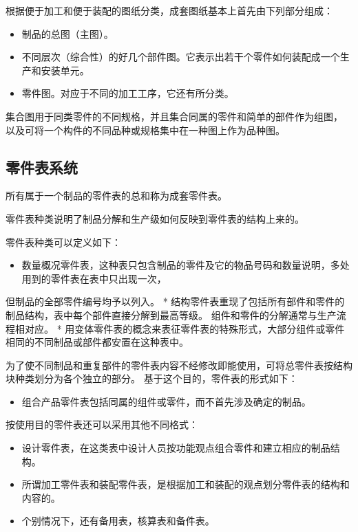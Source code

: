 \documentclass[letterpaper,10pt,english]{sphinxmanual}
\begin{document}
根据便于加工和便于装配的图纸分类，成套图纸基本上首先由下列部分组成：
\begin{itemize}
\item {} 
制品的总图（主图）。

\item {} 
不同层次（综合性）的好几个部件图。它表示出若干个零件如何装配成一个生产和安装单元。

\item {} 
零件图。对应于不同的加工工序，它还有所分类。

\end{itemize}

集合图用于同类零件的不同规格，并且集合同属的零件和简单的部件作为组图，
以及可将一个构件的不同品种或规格集中在一种图上作为品种图。


\subsection{零件表系统}
\label{unit8:id6}
所有属于一个制品的零件表的总和称为成套零件表。

零件表种类说明了制品分解和生产级如何反映到零件表的结构上来的。

零件表种类可以定义如下：
\begin{itemize}
\item {} 
数量概况零件表，这种表只包含制品的零件及它的物品号码和数量说明，多处用到的零件表在表中只出现一次，

\end{itemize}

但制品的全部零件编号均予以列入。
* 结构零件表重现了包括所有部件和零件的制品结构，表中每个部件直接分解到最高等级。
组件和零件的分解通常与生产流程相对应。
* 用变体零件表的概念来表征零件表的特殊形式，大部分组件或零件相同的不同制品或部件都安置在这种表中。

为了使不同制品和重复部件的零件表内容不经修改即能使用，可将总零件表按结构块种类划分为各个独立的部分。
基于这个目的，零件表的形式如下：
\begin{itemize}
\item {} 
组合产品零件表包括同属的组件或零件，而不首先涉及确定的制品。

\end{itemize}

按使用目的零件表还可以采用其他不同格式：
\begin{itemize}
\item {} 
设计零件表，在这类表中设计人员按功能观点组合零件和建立相应的制品结构。

\item {} 
所谓加工零件表和装配零件表，是根据加工和装配的观点划分零件表的结构和内容的。

\item {} 
个别情况下，还有备用表，核算表和备件表。

\end{itemize}
\end{document}
